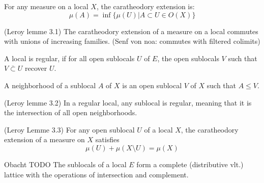 \begin{definition}[Caratheodory]
    \leanok
    \label{def:caratheodory}
    For any measure on a local $X$, the caratheodory extension is:
    \[\mu(A) = \inf \{\mu(U) | A \subset U \in O(X)\}\]
\end{definition}

\begin{lemma}
(Leroy lemme 3.1)
    \label{lem:commutes_with_sup}
    The caratheodory extension of a measure on a local commutes with unions of increasing families.
    (Senf von noa: commutes with filtered colimits)
\end{lemma}



\begin{definition}
    \label{def:regular_local}
    \leanok
    A local is regular, if for all open sublocals $U$ of $E$, the open sublocals $V$ such that $V\bar \subset U$ recover $U$.
\end{definition}



\begin{definition}[Neighborhood]
    \label{def:neighborhood}
    \leanok

    A neighborhood of a sublocal $A$ of $X$ is an open sublocal $V$ of $X$ such that $A \le V$.
\end{definition}

\begin{lemma}
(Leroy lemme 3.2)
    \label{lem:regularity_of_sublocals}
    In a regular local, any sublocal is regular, meaning that it is the intersection of all open neighborhoods.
\end{lemma}


\begin{lemma}[Property 1]
(Leroy Lemme 3.3)
    \label{lem:property_1}
    For any open sublocal $U$ of a local $X$, the caratheodory extension of a measure on $X$ satisfies \[\mu(U) + \mu(X \setminus U) = \mu(X)\]
\end{lemma}



\begin{proposition}
    Obacht TODO
    \label{prop:sublocals_structure}
    The sublocals of a local $E$ form a complete (distributive vlt.) lattice with the operations of intersection and complement.
\end{proposition}


